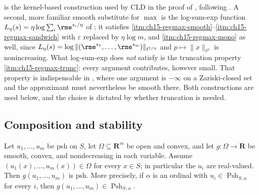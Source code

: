 \begin{remark}
\label{rem:ch15-regularized-maxima}
 is the kernel-based construction used by CLD in the
proof of \cite[Proposition~16.9.1]{CLD25}, following
\cite[Lemma~5.18]{DemBook}.  A second, more familiar smooth substitute for
$\max$ is the log-sum-exp function
$L_\eta(s)=\eta\log\sum_i\rme^{s_i/\eta}$ of
; it satisfies
\cref{itm:ch15-regmax-smooth}--\cref{itm:ch15-regmax-sandwich} with
$\varepsilon$ replaced by $\eta\log m$, and
\cref{itm:ch15-regmax-mono} as well, since
$L_\eta(s)=\log\|(\rme^{s_1},\dots,\rme^{s_m})\|_{\ell^{1/\eta}}$ and
$p\mapsto\|x\|_{\ell^p}$ is nonincreasing.  What log-sum-exp does \emph{not}
satisfy is the truncation property \cref{itm:ch15-regmax-trunc}: every
argument contributes, however small.  That property is indispensable in
, where one argument is $-\infty$ on a
Zariski-closed set and the approximant must nevertheless be smooth there.
Both constructions are used below, and the choice is dictated by whether
truncation is needed.
\end{remark}

\subsection{Composition and stability}

\begin{proposition}
\label{prop:ch15-composition}
Let $u_1,\dots,u_m$ be psh on $S$, let $\Omega\subseteq\mathbf R^m$ be open
and convex, and let $g:\Omega\to\mathbf R$ be smooth, convex, and
nondecreasing in each variable.  Assume $(u_1(x),\dots,u_m(x))\in\Omega$ for
every $x\in S$; in particular the $u_i$ are real-valued.  Then
$g(u_1,\dots,u_m)$ is psh.  More precisely, if $\alpha$ is an ordinal with
$u_i\in\operatorname{Psh}_{S,\alpha}$ for every $i$, then
$g(u_1,\dots,u_m)\in\operatorname{Psh}_{S,\alpha}$.
\end{proposition}

